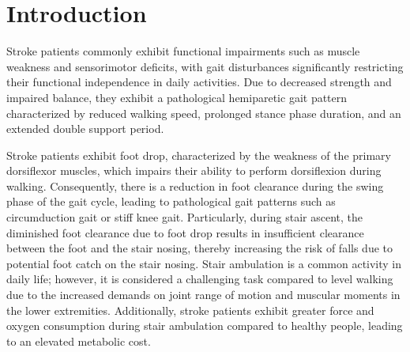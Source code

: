 \documentclass[journal,article,submit,pdftex,moreauthors]{Definitions/mdpi}
\begin{document}



\section{Introduction}
Stroke patients commonly exhibit functional impairments such as muscle weakness and sensorimotor deficits, with gait disturbances significantly restricting their functional independence in daily activities. Due to decreased strength and impaired balance, they exhibit a pathological hemiparetic gait pattern characterized by reduced walking speed, prolonged stance phase duration, and an extended double support period.

Stroke patients exhibit foot drop, characterized by the weakness of the primary dorsiflexor muscles, which impairs their ability to perform dorsiflexion during walking. Consequently, there is a reduction in foot clearance during the swing phase of the gait cycle, leading to pathological gait patterns such as circumduction gait or stiff knee gait. Particularly, during stair ascent, the diminished foot clearance due to foot drop results in insufficient clearance between the foot and the stair nosing, thereby increasing the risk of falls due to potential foot catch on the stair nosing.
Stair ambulation is a common activity in daily life; however, it is considered a  challenging task compared to level walking due to the increased demands on joint range of motion and muscular moments in the lower extremities. Additionally, stroke patients exhibit greater force and oxygen consumption during stair ambulation compared to healthy people, leading to an elevated metabolic cost.
\end{document}
